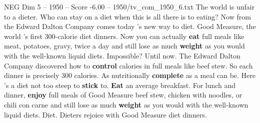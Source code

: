 \begin{textsample}{NEG Dim 5 – 1950 – Score -6.00 – 1950/tv\_com\_1950\_6.txt}  \label{ex:f5_neg_042}
The world is unfair to a dieter.
Who can stay on a diet when this is all there is to eating?
Now from the Edward Dalton Company comes today 's new way to diet.
Good Measure, the world 's first 300-calorie diet dinners.
Now you can actually \textbf{eat} full meals like meat, potatoes, gravy, twice a day and still lose as much \textbf{weight} as you would with the well-known liquid diets.
Impossible?
Until now.
The Edward Dalton Company discovered how to \textbf{control} calories in full meals like beef stew.
So each dinner is precisely 300 calories.
As nutritionally \textbf{complete} as a meal can be.
Here 's a diet not too steep to \textbf{stick} to. \textbf{Eat} an average breakfast.
For lunch and dinner, \textbf{enjoy} full meals of Good Measure beef stew, chicken with noodles, or chili con carne and still lose as much \textbf{weight} as you would with the well-known liquid diets.
Diet.
Dieters rejoice with Good Measure diet dinners.

\end{textsample}
